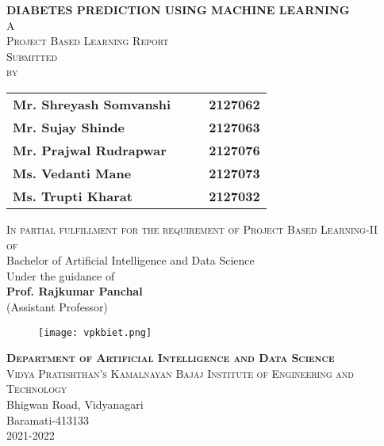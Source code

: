 \documentclass[pdftex,a4paper,11pt,oneside,openright]{report}
\begin{document}

\pagestyle{fancy}
\begin{titlepage}
\begin{center}
\LARGE{\bf{\textsc{DIABETES PREDICTION USING MACHINE LEARNING}\\}}	%
\vspace{10pt}
\textsc{{\small A\\  \small  Project Based Learning Report\\}}		%
\textsc{{\small Submitted \\ \small by\\}}
\begin{table}[htbp]
	\begin{center}
	\begin{tabular}{ l c c l }
	\large\bf{Mr. Shreyash Somvanshi} & & &  \large\bf{2127062} \\[0.3cm] 
        \large\bf{Mr. Sujay Shinde}& & &  \large\bf{2127063} \\[0.3cm]
	\large\bf{Mr. Prajwal Rudrapwar}& & & \large\bf{2127076}   \\[0.3cm]
	\large\bf{Ms. Vedanti Mane}& & & \large\bf{2127073}
	\\[0.3cm]
	\large\bf{Ms. Trupti Kharat}& & & \large\bf{2127032}
		\end{tabular}
	\end{center}
	\end{table}
\textsc{{ \small In partial fulfillment for the requirement of Project Based Learning-II\\ \vspace{1.5pt}of\\}}
\LARGE{{\swabfamily Bachelor of Artificial Intelligence and Data Science\\}}%
\vspace{20pt}
\large{Under the guidance of\\ }
\Large{\bf{Prof. Rajkumar Panchal}\\}
\large{(Assistant Professor)}\\
\vspace{10pt}
\begin{figure}[!h]
\begin{center}
\texttt{[image: vpkbiet.png]}
\end{center}
\end{figure}
\vspace{-.6cm}
\LARGE{\bf{\textsc{Department of Artificial Intelligence and Data Science}}}\\
\Large{ \textsc{Vidya Pratishthan's Kamalnayan Bajaj Institute of Engineering and Technology}}\\
\large{Bhigwan Road, Vidyanagari}\\
\large{Baramati-413133}\\
\large{2021-2022}
\end{center}
\end{titlepage}
\end{document}
